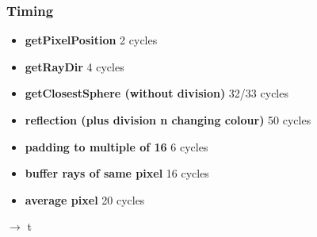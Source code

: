 \documentclass{beamer}
\begin{document}
\begin{frame}
	\frametitle{Timing}
	\begin{itemize}
		\item \textbf{getPixelPosition} 2 cycles
		\item \textbf{getRayDir} 4 cycles
		\item \textbf{getClosestSphere (without division)} 32/33 cycles
		\item \textbf{reflection (plus division n changing colour)} 50 cycles
		\item \textbf{padding to multiple of 16} 6 cycles
		\item \textbf{buffer rays of same pixel} 16 cycles
		\item \textbf{average pixel} 20 cycles
	\end{itemize}
	$\rightarrow$ t
\end{frame}
\end{document}

